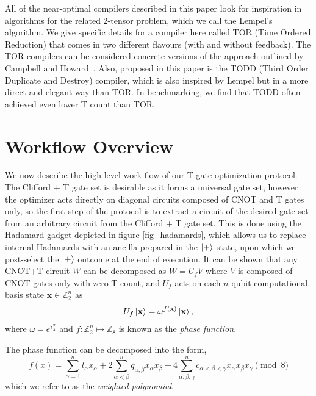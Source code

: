 \documentclass[notitlepage]{article}
\theoremstyle{definition}
\theoremstyle{problem}
\theoremstyle{lemma}
\begin{document}
		All of the near-optimal compilers described in this paper look for inspiration in algorithms for the related 2-tensor problem, which we call the Lempel's algorithm.  We give specific details for a compiler here called TOR (Time Ordered Reduction) that comes in two different flavours (with and without feedback).  The TOR compilers can be considered concrete versions of the approach outlined by Campbell and Howard~\cite{campbell17b}.  Also, proposed in this paper is the TODD (Third Order Duplicate and Destroy) compiler, which is also inspired by Lempel but in a more direct and elegant way than TOR.  In benchmarking, we find that TODD often achieved even lower T count than TOR.  
		
	\FloatBarrier		
		
	\section{Workflow Overview}
		\label{sec_methods}
		\iffalse
		We now describe the high level work-flow of our T gate optimization protocol. The Clifford + T gate set is desirable as it forms a universal gate set, however the optimizer acts directly on diagonal circuits composed of CNOT and T gates only, so the first step of the protocol is to extract a circuit of the desired gate set from an arbitrary circuit from the Clifford + T gate set. This is done using the Hadamard gadget depicted in figure \ref{fig_hadamards}, which allows us to replace internal Hadamards with an ancilla prepared in the $\left\vert{+}\right\rangle$ state, upon which we post-select the $\left\vert{+}\right\rangle$ outcome at the end of execution. It can be shown that any CNOT+T circuit $W$ can be decomposed as $W=U_fV$ where $V$ is composed of CNOT gates only with zero T count, and $U_f$ acts on each $n$-qubit computational basis state $\mathbf{x}\in \mathbb{Z}_2^n$ as
		\begin{equation}
			U_f\left\vert{\mathbf{x}}\right\rangle = \omega^{f(\mathbf{x})}\left\vert{\mathbf{x}}\right\rangle,
		\end{equation}
		where $\omega = e^{i\frac{\pi}{4}}$ and $f:\mathbb{Z}_2^n \mapsto \mathbb{Z}_8$ is known as the \emph{phase function}.

		The phase function can be decomposed into the form,
		\begin{equation}
		f(x) = \sum_{\alpha=1}^{n}l_{\alpha}x_\alpha + 2\sum_{\alpha<\beta}^{n} q_{\alpha,\beta}x_\alpha x_\beta + 4\sum_{\alpha,\beta,\gamma}^{n}c_{\alpha<\beta<\gamma}x_\alpha x_\beta x_\gamma \pmod{8}
		\end{equation}
		which we refer to as the \emph{weighted polynomial}.
		
\end{document}
